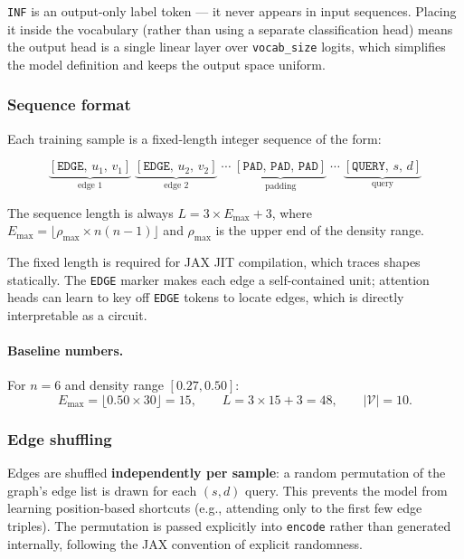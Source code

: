 \documentclass[11pt, a4paper]{article}
\begin{document}
\texttt{INF} is an output-only label token --- it never appears in input
sequences. Placing it inside the vocabulary (rather than using a separate
classification head) means the output head is a single linear layer over
\texttt{vocab\_size} logits, which simplifies the model definition and keeps
the output space uniform.

\subsubsection{Sequence format}

Each training sample is a fixed-length integer sequence of the form:

\[
  \underbrace{[\texttt{EDGE},\, u_1,\, v_1]}_{\text{edge 1}}\;
  \underbrace{[\texttt{EDGE},\, u_2,\, v_2]}_{\text{edge 2}}\;
  \cdots\;
  \underbrace{[\texttt{PAD},\, \texttt{PAD},\, \texttt{PAD}]}_{\text{padding}}\;
  \cdots\;
  \underbrace{[\texttt{QUERY},\, s,\, d]}_{\text{query}}
\]

\noindent The sequence length is always
$L = 3 \times E_{\max} + 3$,
where $E_{\max} = \lfloor \rho_{\max} \times n(n-1) \rfloor$ and
$\rho_{\max}$ is the upper end of the density range.

The fixed length is required for JAX JIT compilation, which traces shapes
statically. The \texttt{EDGE} marker makes each edge a self-contained unit;
attention heads can learn to key off \texttt{EDGE} tokens to locate edges,
which is directly interpretable as a circuit.

\paragraph{Baseline numbers.} For $n = 6$ and density range $[0.27, 0.50]$:
\[
  E_{\max} = \lfloor 0.50 \times 30 \rfloor = 15,
  \qquad
  L = 3 \times 15 + 3 = 48,
  \qquad
  |\mathcal{V}| = 10.
\]

\subsubsection{Edge shuffling}

Edges are shuffled \textbf{independently per sample}: a random permutation of
the graph's edge list is drawn for each $(s, d)$ query. This prevents the
model from learning position-based shortcuts (e.g., attending only to the
first few edge triples). The permutation is passed explicitly into
\texttt{encode} rather than generated internally, following the JAX convention
of explicit randomness.
\end{document}
